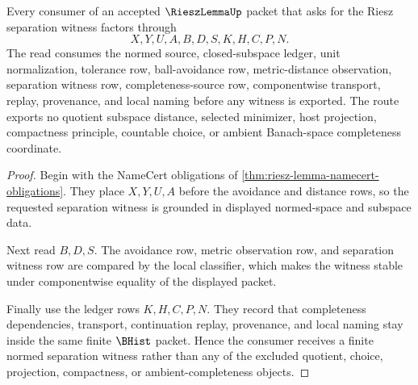 \begin{theorem}
\label{thm:riesz-lemma-normed-separation-witness}
Every consumer of an accepted $\RieszLemmaUp$ packet that asks for the Riesz separation witness factors through
$$
X,Y,U,A,B,D,S,K,H,C,P,N .
$$
The read consumes the normed source, closed-subspace ledger, unit normalization, tolerance row, ball-avoidance row, metric-distance observation, separation witness row, completeness-source row, componentwise transport, replay, provenance, and local naming before any witness is exported. The route exports no quotient subspace distance, selected minimizer, host projection, compactness principle, countable choice, or ambient Banach-space completeness coordinate.
\end{theorem}
\begin{proof}
Begin with the NameCert obligations of \autoref{thm:riesz-lemma-namecert-obligations}. They place $X,Y,U,A$ before the avoidance and distance rows, so the requested separation witness is grounded in displayed normed-space and subspace data.

Next read $B,D,S$. The avoidance row, metric observation row, and separation witness row are compared by the local classifier, which makes the witness stable under componentwise equality of the displayed packet.

Finally use the ledger rows $K,H,C,P,N$. They record that completeness dependencies, transport, continuation replay, provenance, and local naming stay inside the same finite $\BHist$ packet. Hence the consumer receives a finite normed separation witness rather than any of the excluded quotient, choice, projection, compactness, or ambient-completeness objects.
\end{proof}


\begin{closurestatus}{\RieszLemmaUp}
  \theoryclosure{\seedClosure}
  \formalstatus{\unformalizedV}
\end{closurestatus}
